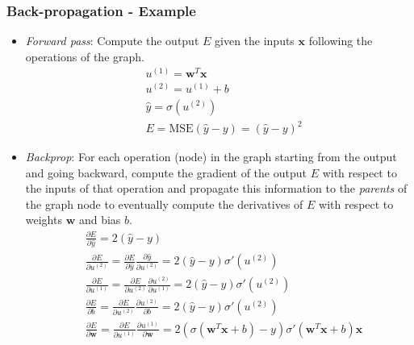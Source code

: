 \documentclass{beamer}
\begin{document}
	\begin{frame}
		\frametitle{Back-propagation - Example}
		\tiny
		\begin{itemize}
			\item \textit{Forward pass}: Compute the output $E$ given the inputs $\bm{x}$ following the operations of the graph.
			\begin{align*}
				&u^{(1)} = \bm{w}^T\bm{x} \\
				&u^{(2)} = u^{(1)} + b \\
				&\hat{y} = \sigma(u^{(2)}) \\
				&E = \textrm{MSE}(\hat{y}-y) = (\hat{y}-y)^2
			\end{align*}
			\item \textit{Backprop}:
			For each operation (node) in the graph starting from the output and going backward, compute the gradient of the output $E$ with respect to the inputs of that operation and propagate this information to the \textit{parents} of the graph node to eventually compute the derivatives of $E$ with respect to weights $\bm{w}$ and bias $b$.
			\begin{align*}
				&\frac{\partial E}{\partial \hat{y}} = 2(\hat{y}-y) \\
				&\frac{\partial E}{\partial u^{(2)}} = \frac{\partial E}{\partial \hat{y}} \frac{\partial \hat{y}}{\partial u^{(2)}} = 2(\hat{y}-y) \sigma'(u^{(2)})\\
				&\frac{\partial E}{\partial u^{(1)}} = \frac{\partial E}{\partial u^{(2)}}  \frac{\partial u^{(2)}}{\partial u^{(1)}}  = 2(\hat{y}-y) \sigma'(u^{(2)})  \\
				&\frac{\partial E}{\partial b}  = \frac{\partial E}{\partial u^{(2)}}  \frac{\partial u^{(2)}}{\partial b}  = 2(\hat{y}-y) \sigma'(u^{(2)})\\
				&\frac{\partial E}{\partial \bm{w}}  =\frac{\partial E}{\partial u^{(1)}} \frac{\partial u^{(1)}}{\partial \bm{w}}= 2( \sigma( \bm{w}^T\bm{x} +b)-y) \sigma'( \bm{w}^T\bm{x} +b) \bm{x}
			\end{align*}
		\end{itemize}
		
	\end{frame}

\end{document}
